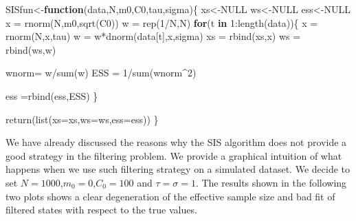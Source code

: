 \documentclass[
]{book}
\newenvironment{Shaded}{\begin{snugshade}}{\end{snugshade}}
\newcommand{\AttributeTok}[1]{\textcolor[rgb]{0.77,0.63,0.00}{#1}}
\newcommand{\ConstantTok}[1]{\textcolor[rgb]{0.00,0.00,0.00}{#1}}
\newcommand{\ControlFlowTok}[1]{\textcolor[rgb]{0.13,0.29,0.53}{\textbf{#1}}}
\newcommand{\DecValTok}[1]{\textcolor[rgb]{0.00,0.00,0.81}{#1}}
\newcommand{\FunctionTok}[1]{\textcolor[rgb]{0.00,0.00,0.00}{#1}}
\newcommand{\NormalTok}[1]{#1}
\newcommand{\OtherTok}[1]{\textcolor[rgb]{0.56,0.35,0.01}{#1}}
\newcommand{\SpecialCharTok}[1]{\textcolor[rgb]{0.00,0.00,0.00}{#1}}
\theoremstyle{break}
\theoremstyle{nonumberplain}
\begin{document}
\begin{Shaded}
\begin{Highlighting}[]
\NormalTok{SISfun}\OtherTok{\textless{}{-}}\ControlFlowTok{function}\NormalTok{(data,N,m0,C0,tau,sigma)\{}
\NormalTok{  xs}\OtherTok{\textless{}{-}}\ConstantTok{NULL}
\NormalTok{  ws}\OtherTok{\textless{}{-}}\ConstantTok{NULL}
\NormalTok{  ess}\OtherTok{\textless{}{-}}\ConstantTok{NULL}
\NormalTok{  x  }\OtherTok{=} \FunctionTok{rnorm}\NormalTok{(N,m0,}\FunctionTok{sqrt}\NormalTok{(C0))}
\NormalTok{  w  }\OtherTok{=} \FunctionTok{rep}\NormalTok{(}\DecValTok{1}\SpecialCharTok{/}\NormalTok{N,N)}
  \ControlFlowTok{for}\NormalTok{(t }\ControlFlowTok{in} \DecValTok{1}\SpecialCharTok{:}\FunctionTok{length}\NormalTok{(data))\{}
\NormalTok{    x    }\OtherTok{=} \FunctionTok{rnorm}\NormalTok{(N,x,tau)                   }
\NormalTok{    w    }\OtherTok{=}\NormalTok{ w}\SpecialCharTok{*}\FunctionTok{dnorm}\NormalTok{(data[t],x,sigma)         }
\NormalTok{    xs }\OtherTok{=} \FunctionTok{rbind}\NormalTok{(xs,x)}
\NormalTok{    ws }\OtherTok{=} \FunctionTok{rbind}\NormalTok{(ws,w)}
    
\NormalTok{    wnorm}\OtherTok{=}\NormalTok{ w}\SpecialCharTok{/}\FunctionTok{sum}\NormalTok{(w)                         }
\NormalTok{    ESS  }\OtherTok{=} \DecValTok{1}\SpecialCharTok{/}\FunctionTok{sum}\NormalTok{(wnorm}\SpecialCharTok{\^{}}\DecValTok{2}\NormalTok{)                   }
    
\NormalTok{    ess }\OtherTok{=}\FunctionTok{rbind}\NormalTok{(ess,ESS)}
\NormalTok{  \}}
  
  \FunctionTok{return}\NormalTok{(}\FunctionTok{list}\NormalTok{(}\AttributeTok{xs=}\NormalTok{xs,}\AttributeTok{ws=}\NormalTok{ws,}\AttributeTok{ess=}\NormalTok{ess))}
\NormalTok{\}}
\end{Highlighting}
\end{Shaded}

We have already discussed the reasons why the SIS algorithm does not
provide a good strategy in the filtering problem. We provide a graphical
intuition of what happens when we use such filtering strategy on a
simulated dataset. We decide to set \(N=1000\),\(m_{0}=0\),\(C_{0}=100\)
and \(\tau=\sigma=1\). The results shown in the following two plots
shows a clear degeneration of the effective sample size and bad fit of
filtered states with respect to the true values.
\end{document}
